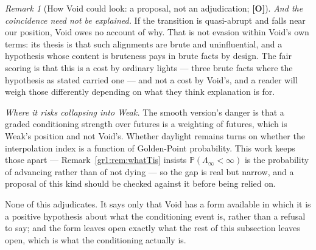 \documentclass[11pt]{article}
\numberwithin{equation}{section}
\theoremstyle{plain}
\theoremstyle{definition}
\theoremstyle{remark}
\newtheorem{remark}[theorem]{Remark}
\newcommand{\PP}{\mathbb{P}}
\begin{document}
\begin{remark}[How Void could look: a proposal, not an adjudication;
\textbf{[O]}]
\emph{And the coincidence need not be explained.} If the transition is
quasi-abrupt and falls near our position, Void owes no account of why.
That is not evasion within Void's own terms: its thesis is that such
alignments are brute and uninfluential, and a hypothesis whose content
is bruteness pays in brute facts by design. The fair scoring is that
this is a cost by ordinary lights --- three brute facts where the
hypothesis as stated carried one --- and not a cost by Void's, and a
reader will weigh those differently depending on what they think
explanation is for.

\emph{Where it risks collapsing into Weak.} The smooth version's danger
is that a graded conditioning strength over futures is a weighting of
futures, which is Weak's position and not Void's. Whether daylight
remains turns on whether the interpolation index is a function of
Golden-Point probability. This work keeps those apart ---
Remark~\ref{gr1:rem:whatTis} insists $\PP(\Lambda_\infty<\infty)$ is the
probability of advancing rather than of not dying --- so the gap is real
but narrow, and a proposal of this kind should be checked against it
before being relied on.

None of this adjudicates. It says only that Void has a form available in
which it is a positive hypothesis about what the conditioning event is,
rather than a refusal to say; and the form leaves open exactly what the
rest of this subsection leaves open, which is what the conditioning
actually is.
\end{remark}
\end{document}
